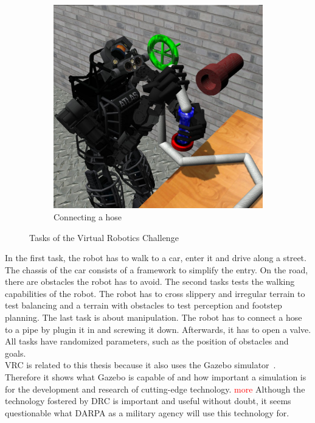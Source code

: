 \begin{figure}
\begin{subfigure}[b]{0.3\textwidth}
    \includegraphics[width=\textwidth]{pics/darpa_hose}
    \caption{Connecting a hose}
    \label{fig:vrc_hose}
  \end{subfigure}
  \caption{Tasks of the Virtual Robotics Challenge~\cite{vrc_pics}}
  \label{fig:vrc}
\end{figure}
In the first task, the robot has to walk to a car, enter it and drive along a street. The chassis of the car consists of a framework to simplify the entry. On the road, there are obstacles the robot has to avoid. The second tasks tests the walking capabilities of the robot. The robot has to cross slippery and irregular terrain to test balancing and a terrain with obstacles to test perception and footstep planning. The last task is about manipulation. The robot has to connect a hose to a pipe by plugin it in and screwing it down. Afterwards, it has to open a valve. All tasks have randomized parameters, such as the position of obstacles and goals.\\
VRC is related to this thesis because it also uses the Gazebo simulator~\cite{IEEESpectrum}. Therefore it shows what Gazebo is capable of and how important a simulation is for the development and research of cutting-edge technology. \textcolor{red}{more}
Although the technology fostered by DRC is important and useful without doubt, it seems questionable what DARPA as a military agency will use this technology for.


